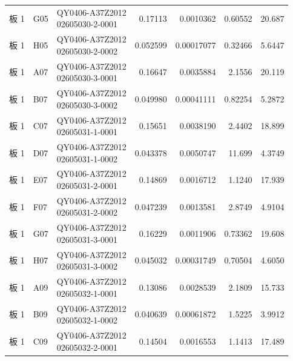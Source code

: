 \documentclass[UTF8,10pt,a4paper,fontset=fandol]{ctexart}
\begin{document}
\begin{tabular}{@{}llp{3.1cm}rrrr@{}}
板 1 & G05 & \shortstack[l]{QY0406-A37Z2012\\02605030-2-0001} & 0.17113 & 0.0010362 & 0.60552 & 20.687 \\
板 1 & H05 & \shortstack[l]{QY0406-A37Z2012\\02605030-2-0002} & 0.052599 & 0.00017077 & 0.32466 & 5.6447 \\
板 1 & A07 & \shortstack[l]{QY0406-A37Z2012\\02605030-3-0001} & 0.16647 & 0.0035884 & 2.1556 & 20.119 \\
板 1 & B07 & \shortstack[l]{QY0406-A37Z2012\\02605030-3-0002} & 0.049980 & 0.00041111 & 0.82254 & 5.2872 \\
板 1 & C07 & \shortstack[l]{QY0406-A37Z2012\\02605031-1-0001} & 0.15651 & 0.0038190 & 2.4402 & 18.899 \\
板 1 & D07 & \shortstack[l]{QY0406-A37Z2012\\02605031-1-0002} & 0.043378 & 0.0050747 & 11.699 & 4.3749 \\
板 1 & E07 & \shortstack[l]{QY0406-A37Z2012\\02605031-2-0001} & 0.14869 & 0.0016712 & 1.1240 & 17.939 \\
板 1 & F07 & \shortstack[l]{QY0406-A37Z2012\\02605031-2-0002} & 0.047239 & 0.0013581 & 2.8749 & 4.9104 \\
板 1 & G07 & \shortstack[l]{QY0406-A37Z2012\\02605031-3-0001} & 0.16229 & 0.0011906 & 0.73362 & 19.608 \\
板 1 & H07 & \shortstack[l]{QY0406-A37Z2012\\02605031-3-0002} & 0.045032 & 0.00031749 & 0.70504 & 4.6050 \\
板 1 & A09 & \shortstack[l]{QY0406-A37Z2012\\02605032-1-0001} & 0.13086 & 0.0028539 & 2.1809 & 15.733 \\
板 1 & B09 & \shortstack[l]{QY0406-A37Z2012\\02605032-1-0002} & 0.040639 & 0.00061872 & 1.5225 & 3.9912 \\
板 1 & C09 & \shortstack[l]{QY0406-A37Z2012\\02605032-2-0001} & 0.14504 & 0.0016553 & 1.1413 & 17.489 \\
\hline
\end{tabular}

\end{document}
